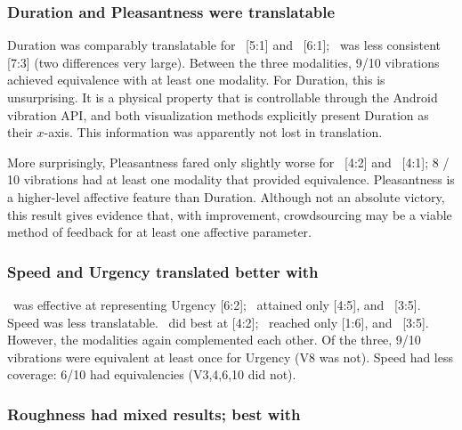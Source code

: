  \subsubsection{Duration and Pleasantness were translatable}
    Duration was comparably translatable for \lofi\ [5:1] and \linear\ [6:1]; \original\ was less consistent [7:3] (two differences very large).
    Between the three modalities, 9/10 vibrations achieved equivalence with at least one modality.
    For Duration, this is unsurprising. It is a physical property that is controllable through the Android vibration API, and both visualization methods explicitly present Duration as their $x$-axis. %
    This information was apparently not lost in translation.
    
    More surprisingly, Pleasantness fared only slightly worse for \lofi\ [4:2]
    and \linear\ [4:1]; 8 / 10 vibrations had at least one modality that provided equivalence.
     Pleasantness is a higher-level affective feature than Duration.
     Although not an absolute victory, this result gives evidence that, with improvement, crowdsourcing may be a viable method of feedback for at least one affective parameter.
    
    \vspace{0.1in}
    \subsubsection{Speed and Urgency translated better with \lofi}
    	\lofi\ was  effective at representing Urgency [6:2]; \linear\ attained only  [4:5], and \original\ [3:5].
	Speed was less translatable. \lofi~did best at [4:2];
	\original~reached only [1:6], and \linear~[3:5].
	However, the modalities again complemented each other.
	Of the three, 9/10 vibrations were equivalent at least once for Urgency (V8 was not).
	Speed had less coverage: 6/10 had equivalencies (V3,4,6,10 did not).
	
	\subsubsection{Roughness had mixed results; best with \linear}
    
